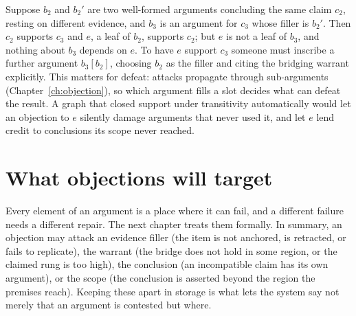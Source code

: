 \begin{remark}
Suppose $b_2$ and $b_2'$ are two well-formed arguments concluding the same claim $c_2$, resting on different evidence, and $b_3$ is an argument for $c_3$ whose filler is $b_2'$. Then $c_2$ supports $c_3$ and $e$, a leaf of $b_2$, supports $c_2$; but $e$ is not a leaf of $b_3$, and nothing about $b_3$ depends on $e$. To have $e$ support $c_3$ someone must inscribe a further argument $b_3[b_2]$, choosing $b_2$ as the filler and citing the bridging warrant explicitly. This matters for defeat: attacks propagate through sub-arguments (Chapter~\ref{ch:objection}), so which argument fills a slot decides what can defeat the result. A graph that closed support under transitivity automatically would let an objection to $e$ silently damage arguments that never used it, and let $e$ lend credit to conclusions its scope never reached.
\end{remark}

\section{What objections will target}

Every element of an argument is a place where it can fail, and a different failure needs a different repair. The next chapter treats them formally. In summary, an objection may attack an evidence filler (the item is not anchored, is retracted, or fails to replicate), the warrant (the bridge does not hold in some region, or the claimed rung is too high), the conclusion (an incompatible claim has its own argument), or the scope (the conclusion is asserted beyond the region the premises reach). Keeping these apart in storage is what lets the system say not merely that an argument is contested but where.
